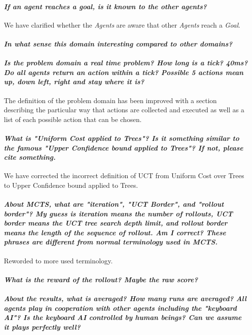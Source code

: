 \documentclass{article}
\begin{document}
\paragraph*{\textit{If an agent reaches a goal, is it known to the other agents?}}
We have clarified whether the \emph{Agents} are aware that other \emph{Agents} reach a \emph{Goal}.

\paragraph*{\textit{In what sense this domain interesting compared to other domains?}}


\paragraph*{\textit{Is the problem domain a real time problem? How long is a tick? 40ms? Do all agents return an action within a tick? Possible 5 actions mean up, down left, right and stay where it is?}}
The definition of the problem domain has been improved with a section describing the particular way that actions are collected and executed as well as a list of each possible action that can be chosen.

\paragraph*{\textit{What is "Uniform Cost applied to Trees"? Is it something similar to the famous "Upper Confidence bound applied to Trees"? If not, please cite something.}}
We have corrected the incorrect definition of UCT from Uniform Cost over Trees to Upper Confidence bound applied to Trees.
\paragraph*{\textit{About MCTS, what are "iteration", "UCT Border", and "rollout border"? My guess is iteration means the number of rollouts,
UCT border means the UCT tree search depth limit, and rollout border means the length of the sequence of rollout. Am I correct? These phrases are different from normal terminology used in MCTS.}}
Reworded to more used terminology.
\paragraph*{\textit{What is the reward of the rollout? Maybe the raw score?}}
\paragraph*{\textit{About the results, what is averaged?
How many runs are averaged?
All agents play in cooperation with other agents including the "keyboard AI"?
Is the keyboard AI controlled by human beings?
Can we assume it plays perfectly well?}}
\end{document}
